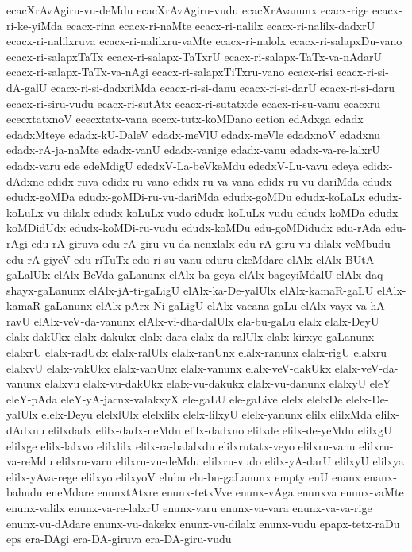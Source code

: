 {ecacXrAvAgiru-vu-deMdu
ecacXrAvAgiru-vudu
ecacXrAvanunx
ecacx-rige
ecacx-ri-ke-yiMda
ecacx-rina
ecacx-ri-naMte
ecacx-ri-nalilx
ecacx-ri-nalilx-dadxrU
ecacx-ri-nalilxruva
ecacx-ri-nalilxru-vaMte
ecacx-ri-nalolx
ecacx-ri-salapxDu-vano
ecacx-ri-salapxTaTx
ecacx-ri-salapx-TaTxrU
ecacx-ri-salapx-TaTx-va-nAdarU
ecacx-ri-salapx-TaTx-va-nAgi
ecacx-ri-salapxTiTxru-vano
ecacx-risi
ecacx-ri-si-dA-galU
ecacx-ri-si-dadxriMda
ecacx-ri-si-danu
ecacx-ri-si-darU
ecacx-ri-si-daru
ecacx-ri-siru-vudu
ecacx-ri-sutAtx
ecacx-ri-sutatxde
ecacx-ri-su-vanu
ecacxru
ececxtatxnoV
ececxtatx-vana
ececx-tutx-koMDano
ection
edAdxga
edadx
edadxMteye
edadx-kU-DaleV
edadx-meVlU
edadx-meVle
edadxnoV
edadxnu
edadx-rA-ja-naMte
edadx-vanU
edadx-vanige
edadx-vanu
edadx-va-re-lalxrU
edadx-varu
ede
edeMdigU
ededxV-La-beVkeMdu
ededxV-Lu-vavu
edeya
edidx-dAdxne
edidx-ruva
edidx-ru-vano
edidx-ru-va-vana
edidx-ru-vu-dariMda
edudx
edudx-goMDa
edudx-goMDi-ru-vu-dariMda
edudx-goMDu
edudx-koLaLx
edudx-koLuLx-vu-dilalx
edudx-koLuLx-vudo
edudx-koLuLx-vudu
edudx-koMDa
edudx-koMDidUdx
edudx-koMDi-ru-vudu
edudx-koMDu
edu-goMDidudx
edu-rAda
edu-rAgi
edu-rA-giruva
edu-rA-giru-vu-da-nenxlalx
edu-rA-giru-vu-dilalx-veMbudu
edu-rA-giyeV
edu-riTuTx
edu-ri-su-vanu
eduru
ekeMdare
elAlx
elAlx-BUtA-gaLalUlx
elAlx-BeVda-gaLanunx
elAlx-ba-geya
elAlx-bageyiMdalU
elAlx-daq-shayx-gaLanunx
elAlx-jA-ti-gaLigU
elAlx-ka-De-yalUlx
elAlx-kamaR-gaLU
elAlx-kamaR-gaLanunx
elAlx-pArx-Ni-gaLigU
elAlx-vacana-gaLu
elAlx-vayx-va-hA-ravU
elAlx-veV-da-vanunx
elAlx-vi-dha-dalUlx
ela-bu-gaLu
elalx
elalx-DeyU
elalx-dakUkx
elalx-dakukx
elalx-dara
elalx-da-ralUlx
elalx-kirxye-gaLanunx
elalxrU
elalx-radUdx
elalx-ralUlx
elalx-ranUnx
elalx-ranunx
elalx-rigU
elalxru
elalxvU
elalx-vakUkx
elalx-vanUnx
elalx-vanunx
elalx-veV-dakUkx
elalx-veV-da-vanunx
elalxvu
elalx-vu-dakUkx
elalx-vu-dakukx
elalx-vu-danunx
elalxyU
eleY
eleY-pAda
eleY-yA-jacnx-valakxyX
ele-gaLU
ele-gaLive
elelx
elelxDe
elelx-De-yalUlx
elelx-Deyu
elelxlUlx
elelxlilx
elelx-lilxyU
elelx-yanunx
elilx
elilxMda
elilx-dAdxnu
elilxdadx
elilx-dadx-neMdu
elilx-dadxno
elilxde
elilx-de-yeMdu
elilxgU
elilxge
elilx-lalxvo
elilxlilx
elilx-ra-balalxdu
elilxrutatx-veyo
elilxru-vanu
elilxru-va-reMdu
elilxru-varu
elilxru-vu-deMdu
elilxru-vudo
elilx-yA-darU
elilxyU
elilxya
elilx-yAva-rege
elilxyo
elilxyoV
elubu
elu-bu-gaLanunx
empty
enU
enanx
enanx-bahudu
eneMdare
enunxtAtxre
enunx-tetxVve
enunx-vAga
enunxva
enunx-vaMte
enunx-valilx
enunx-va-re-lalxrU
enunx-varu
enunx-va-vara
enunx-va-va-rige
enunx-vu-dAdare
enunx-vu-dakekx
enunx-vu-dilalx
enunx-vudu
epapx-tetx-raDu
eps
era-DAgi
era-DA-giruva
era-DA-giru-vudu
}
